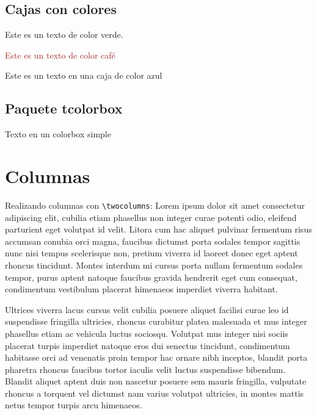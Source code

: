 \documentclass{article}
\begin{document}
		\subsection{Cajas con colores}
		
		\textcolor{applegreen}{Este es un texto de color verde.}
		
		\textcolor{brown}{Este es un texto de color café}
		
		\colorbox{non-photoblue}{Este es un texto en una caja de color azul}
		
		
		
		\subsection{Paquete \ttfamily tcolorbox}
		
		\begin{tcolorbox}[
				colback = orange!30, %
				colframe = gray, 
				arc = 3mm, 
				width = 0.7\textwidth,
				height = 40pt,	
				boxrule = 5pt,
				enhanced jigsaw,
				drop shadow = {green!30}
				]
			Texto en un colorbox simple
		\end{tcolorbox}
	
	\section{Columnas}
	Realizando columnas con \verb|\twocolumns|: 
	\twocolumn Lorem ipsum dolor sit amet consectetur adipiscing elit, cubilia etiam phasellus non integer curae potenti odio, eleifend parturient eget volutpat id velit. Litora cum hac aliquet pulvinar fermentum risus accumsan conubia orci magna, faucibus dictumst porta sodales tempor sagittis nunc nisi tempus scelerisque non, pretium viverra id laoreet donec eget aptent rhoncus tincidunt. Montes interdum mi cursus porta nullam fermentum sodales tempor, purus aptent natoque faucibus gravida hendrerit eget cum consequat, condimentum vestibulum placerat himenaeos imperdiet viverra habitant.
	
	Ultrices viverra lacus cursus velit cubilia posuere aliquet facilisi curae leo id suspendisse fringilla ultricies, rhoncus curabitur platea malesuada et mus integer phasellus etiam ac vehicula luctus sociosqu. Volutpat mus integer nisi sociis placerat turpis imperdiet natoque eros dui senectus tincidunt, condimentum habitasse orci ad venenatis proin tempor hac ornare nibh inceptos, blandit porta pharetra rhoncus faucibus tortor iaculis velit luctus suspendisse bibendum. Blandit aliquet aptent duis non nascetur posuere sem mauris fringilla, vulputate rhoncus a torquent vel dictumst nam varius volutpat ultricies, in montes mattis netus tempor turpis arcu himenaeos.
	
\end{document}
